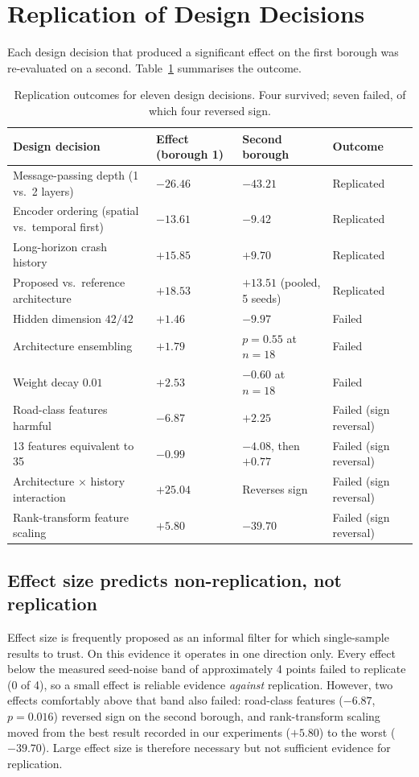 \documentclass[conference]{IEEEtran}
\begin{document}
\section{Replication of Design Decisions}
\label{sec:replication}

Each design decision that produced a significant effect on the first
borough was re-evaluated on a second. Table~\ref{tab:replication}
summarises the outcome.

\begin{table}[t]
\caption{Replication outcomes for eleven design decisions. Four survived;
seven failed, of which four reversed sign.}
\label{tab:replication}
\centering
\small
\begin{tabular}{llll}
\toprule
Design decision & Effect (borough 1) & Second borough & Outcome \\
\midrule
Message-passing depth (1 vs.\ 2 layers) & $-26.46$ & $-43.21$ & Replicated \\
Encoder ordering (spatial vs.\ temporal first) & $-13.61$ & $-9.42$ & Replicated \\
Long-horizon crash history & $+15.85$ & $+9.70$ & Replicated \\
Proposed vs.\ reference architecture & $+18.53$ & $+13.51$ (pooled, 5 seeds) & Replicated \\
Hidden dimension $42/42$ & $+1.46$ & $-9.97$ & Failed \\
Architecture ensembling & $+1.79$ & $p=0.55$ at $n=18$ & Failed \\
Weight decay $0.01$ & $+2.53$ & $-0.60$ at $n=18$ & Failed \\
Road-class features harmful & $-6.87$ & $+2.25$ & Failed (sign reversal) \\
13 features equivalent to 35 & $-0.99$ & $-4.08$, then $+0.77$ & Failed (sign reversal) \\
Architecture $\times$ history interaction & $+25.04$ & Reverses sign & Failed (sign reversal) \\
Rank-transform feature scaling & $+5.80$ & $-39.70$ & Failed (sign reversal) \\
\bottomrule
\end{tabular}
\end{table}

\subsection{Effect size predicts non-replication, not replication}

Effect size is frequently proposed as an informal filter for which
single-sample results to trust. On this evidence it operates in one
direction only. Every effect below the measured seed-noise band of
approximately 4 points failed to replicate (0 of 4), so a small effect is
reliable evidence \emph{against} replication. However, two effects
comfortably above that band also failed: road-class features ($-6.87$,
$p=0.016$) reversed sign on the second borough, and rank-transform scaling
moved from the best result recorded in our experiments ($+5.80$) to the
worst ($-39.70$). Large effect size is therefore necessary but not
sufficient evidence for replication.
\end{document}
